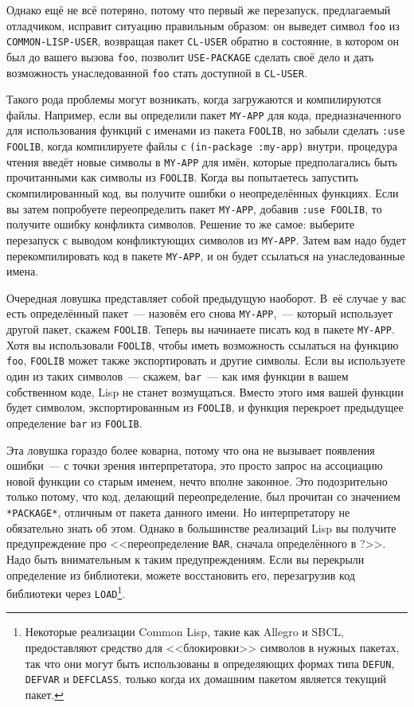 Однако ещё не всё потеряно, потому что первый же перезапуск, предлагаемый отладчиком,
исправит ситуацию правильным образом: он выведет символ \lstinline{foo} из
\lstinline{COMMON-LISP-USER}, возвращая пакет \lstinline{CL-USER} обратно в состояние, в котором он
был до вашего вызова \lstinline{foo}, позволит \lstinline{USE-PACKAGE} сделать своё дело и дать
возможность унаследованной \lstinline{foo} стать доступной в \lstinline{CL-USER}.

Такого рода проблемы могут возникать, когда загружаются и компилируются файлы. Например,
если вы определили пакет \lstinline{MY-APP} для кода, предназначенного для использования
функций с именами из пакета \lstinline{FOOLIB}, но забыли сделать \lstinline{:use FOOLIB}, когда
компилируете файлы с \lstinline{(in-package :my-app)} внутри, процедура чтения введёт новые символы
в \lstinline{MY-APP} для имён, которые предполагались быть прочитанными как символы из
\lstinline{FOOLIB}. Когда вы попытаетесь запустить скомпилированный код, вы получите ошибки о
неопределённых функциях. Если вы затем попробуете переопределить пакет \lstinline{MY-APP},
добавив \lstinline{:use FOOLIB}, то получите ошибку конфликта символов. Решение то же самое:
выберите перезапуск с выводом конфликтующих символов из \lstinline{MY-APP}. Затем вам надо
будет перекомпилировать код в пакете \lstinline{MY-APP}, и он будет ссылаться на унаследованные
имена.

Очередная ловушка представляет собой предыдущую наоборот. В~её случае у вас есть
определённый пакет~--- назовём его снова \lstinline{MY-APP},~--- который использует другой
пакет, скажем \lstinline{FOOLIB}. Теперь вы начинаете писать код в пакете \lstinline{MY-APP}. Хотя
вы использовали \lstinline{FOOLIB}, чтобы иметь возможность ссылаться на функцию \lstinline{foo},
\lstinline{FOOLIB} может также экспортировать и другие символы. Если вы используете один из
таких символов~--- скажем, \lstinline{bar}~--- как имя функции в вашем собственном коде, Lisp
не станет возмущаться. Вместо этого имя вашей функции будет символом, экспортированным из
\lstinline{FOOLIB}, и функция перекроет предыдущее определение \lstinline{bar} из \lstinline{FOOLIB}.

Эта ловушка гораздо более коварна, потому что она не вызывает появления ошибки~--- с точки
зрения интерпретатора, это просто запрос на ассоциацию новой функции со старым именем,
нечто вполне законное. Это подозрительно только потому, что код, делающий переопределение,
был прочитан со значением \lstinline{*PACKAGE*}, отличным от пакета данного имени. Но
интерпретатору не обязательно знать об этом. Однако в большинстве реализаций Lisp вы получите
предупреждение про <<переопределение \lstinline{BAR}, сначала определённого в ?>>. Надо быть
внимательным к таким предупреждениям. Если вы перекрыли определение из библиотеки, можете
восстановить его, перезагрузив код библиотеки через \lstinline{LOAD}\footnote{Некоторые
  реализации Common Lisp, такие как Allegro и SBCL, предоставляют средство для
  <<блокировки>> символов в нужных пакетах, так что они могут быть использованы в
  определяющих формах типа \lstinline{DEFUN}, \lstinline{DEFVAR} и \lstinline{DEFCLASS}, только когда их
  домашним пакетом является текущий пакет.}.

